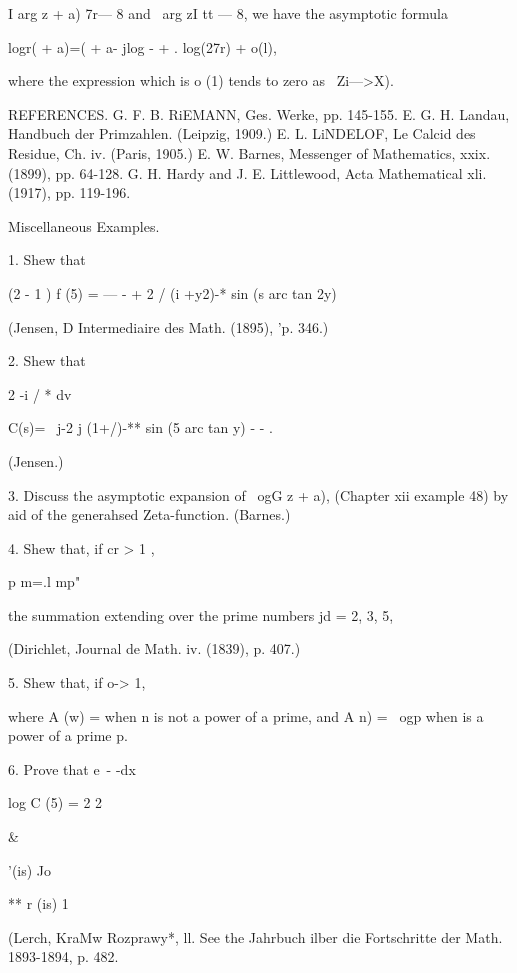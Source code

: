 {{I arg  z + a)   7r— 8 and \ arg zI tt — 8, 
we have the asymptotic formula 

logr(  + a)=(  + a- jlog -  + . log(27r) + o(l), 

where the expression which is o (1) tends to zero as \ Zi—>X). 

REFERENCES. 
G. F. B. RiEMANN, Ges. Werke, pp. 145-155. 
E. G. H. Landau, Handbuch der Primzahlen. (Leipzig, 1909.) 
E. L. LiNDELOF, Le Calcid des Residue, Ch. iv. (Paris, 1905.) 
E. W. Barnes, Messenger of Mathematics, xxix. (1899), pp. 64-128. 
G. H. Hardy and J. E. Littlewood, Acta Mathematical xli. (1917), pp. 119-196. 

Miscellaneous Examples. 

1. Shew that 



(2  - 1 ) f (5) = — - + 2 / (i +y2)-*  sin (s arc tan 2y)   



(Jensen, D Intermediaire des Math. (1895), 'p. 346.) 

2. Shew that 

2 -i / * dv 

C(s)= \ j-2 j  (1+/)-** sin (5 arc tan y)  - - . 

(Jensen.) 

3. Discuss the asymptotic expansion of \ ogG  z + a), (Chapter xii example 48) by 
aid of the generahsed Zeta-function. (Barnes.) 

4. Shew that, if cr > 1 , 

p m=.l mp" 

the summation extending over the prime numbers jd = 2, 3, 5, 

(Dirichlet, Journal de Math. iv. (1839), p. 407.) 

5. Shew that, if o-> 1, 

where A (w) = when n is not a power of a prime, and A  n) = \ ogp when   is a power of a 
prime p. 

6. Prove that 
e~- -dx 



log C (5) = 2 2 



 \& 



'(is) Jo 



** r (is) 1 



(Lerch, KraMw Rozprawy*, ll. 
See the Jahrbuch ilber die Fortschritte der Math. 1893-1894, p. 482. 



}}
